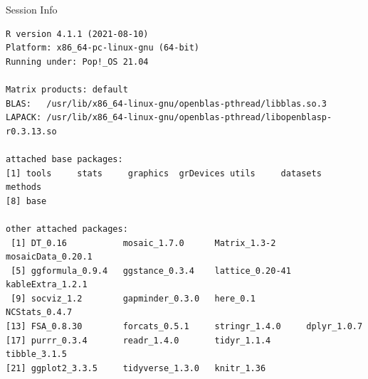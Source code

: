 \documentclass[10pt]{beamer}\usepackage[]{graphicx}\usepackage[]{color}
\makeatletter
\newenvironment{kframe}{%
 \def\at@end@of@kframe{}%
 \ifinner\ifhmode%
  \def\at@end@of@kframe{\end{minipage}}%
  \begin{minipage}{\columnwidth}%
 \fi\fi%
 \def\FrameCommand##1{\hskip\@totalleftmargin \hskip-\fboxsep
 \colorbox{shadecolor}{##1}\hskip-\fboxsep
     \hskip-\linewidth \hskip-\@totalleftmargin \hskip\columnwidth}%
 \MakeFramed {\advance\hsize-\width
   \@totalleftmargin\z@ \linewidth\hsize
   \@setminipage}}%
 {\par\unskip\endMakeFramed%
 \at@end@of@kframe}
\newenvironment{knitrout}{}{} %
\makeatother
\begin{document}


\begin{frame}[fragile]{Session Info}
	\tiny
	
\begin{knitrout}\tiny
{}\color{fgcolor}\begin{kframe}
\begin{verbatim}
R version 4.1.1 (2021-08-10)
Platform: x86_64-pc-linux-gnu (64-bit)
Running under: Pop!_OS 21.04

Matrix products: default
BLAS:   /usr/lib/x86_64-linux-gnu/openblas-pthread/libblas.so.3
LAPACK: /usr/lib/x86_64-linux-gnu/openblas-pthread/libopenblasp-r0.3.13.so

attached base packages:
[1] tools     stats     graphics  grDevices utils     datasets  methods  
[8] base     

other attached packages:
 [1] DT_0.16           mosaic_1.7.0      Matrix_1.3-2      mosaicData_0.20.1
 [5] ggformula_0.9.4   ggstance_0.3.4    lattice_0.20-41   kableExtra_1.2.1 
 [9] socviz_1.2        gapminder_0.3.0   here_0.1          NCStats_0.4.7    
[13] FSA_0.8.30        forcats_0.5.1     stringr_1.4.0     dplyr_1.0.7      
[17] purrr_0.3.4       readr_1.4.0       tidyr_1.1.4       tibble_3.1.5     
[21] ggplot2_3.3.5     tidyverse_1.3.0   knitr_1.36       


\end{verbatim}
\end{kframe}
\end{knitrout}
\end{frame}
\end{document}
